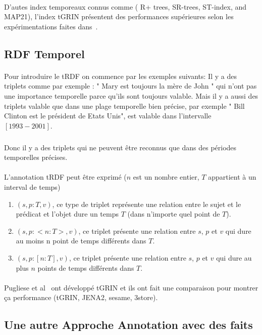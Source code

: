 \paragraph{}
D'autes index temporeaux connus comme ( R+ trees, SR-trees, ST-index, and MAP21), l'index tGRIN présentent des performances supérieures selon les expérimentations faites dans~\cite{pugliese2008}.
\subsection*{RDF Temporel}
\paragraph{}
Pour introduire le tRDF on commence par les exemples suivants:
\newline
Il y a des triplets comme par exemple : " Mary est toujours la mère de John " qui n'ont pas une importance temporelle parce qu'ils sont toujours valable.
Mais il y a aussi des triplets valable que dans une plage temporelle bien précise, par exemple
" Bill Clinton est le président de Etats Unis", est valable dans l'intervalle $[1993-2001]$.   
\subparagraph{}
Donc il y a des triplets qui ne peuvent être reconnus que dans des périodes temporelles précises.
\paragraph{}
L’annotation tRDF peut être exprimé ($n$ est un nombre entier, $T$ appartient à un interval de temps)
\begin{enumerate}
\item $(s, p : {T}, v)$, ce type de triplet représente une relation entre le sujet et le prédicat et l'objet dure un temps $T$ (dans n'importe quel point de $T$).
\item $(s, p : <n : T>, v)$, ce triplet présente une relation entre $s$, $p$ et $v$ qui dure au moins n point de temps différents dans $T$.
\item $(s, p : [n : T ], v)$, ce triplet présente une relation entre $s$, $p$ et $v$ qui dure au plus $n$ points de temps différents dans $T$. 
\end{enumerate}
\paragraph{}
Pugliese et al~\cite{pugliese2008} ont développé tGRIN et ils ont fait une comparaison pour montrer ça performance (tGRIN, JENA2, sesame, 3store).
\subsection*{Une autre Approche Annotation avec des faits}
